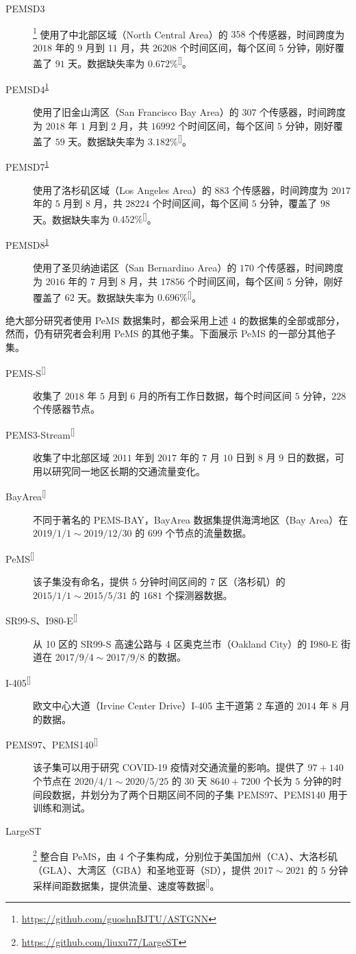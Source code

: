 \documentclass{ctexart}
\renewcommand{\cite}[1]{\textsuperscript{[\citenum{#1}]}}
\begin{document}
\begin{description}
    \item[PEMSD3]\footnote{\url{https://github.com/guoshnBJTU/ASTGNN}\label{pems0x}} 使用了中北部区域（North Central Area）的 $358$ 个传感器，时间跨度为 $2018$ 年的 $9$ 月到 $11$ 月，共 $26208$ 个时间区间，每个区间 $5$ 分钟，刚好覆盖了 $91$ 天。数据缺失率为 $0.672\%$\cite{T-158}。
    \item[PEMSD4\textsuperscript{\ref{pems0x}}] 使用了旧金山湾区（San Francisco Bay Area）的 $307$ 个传感器，时间跨度为 $2018$ 年 $1$ 月到 $2$ 月，共 $16992$ 个时间区间，每个区间 $5$ 分钟，刚好覆盖了 $59$ 天。数据缺失率为 $3.182\%$\cite{T-158}。
    \item[PEMSD7\textsuperscript{\ref{pems0x}}] 使用了洛杉矶区域（Los Angeles Area）的 $883$ 个传感器，时间跨度为 $2017$ 年的 $5$ 月到 $8$ 月，共 $28224$ 个时间区间，每个区间 $5$ 分钟，覆盖了 $98$ 天。数据缺失率为 $0.452\%$\cite{T-158}。
    \item[PEMSD8\textsuperscript{\ref{pems0x}}] 使用了圣贝纳迪诺区（San Bernardino Area）的 $170$ 个传感器，时间跨度为 $2016$ 年的 $7$ 月到 $8$ 月，共 $17856$ 个时间区间，每个区间 $5$ 分钟，刚好覆盖了 $62$ 天。数据缺失率为 $0.696\%$\cite{T-158}。
\end{description}

绝大部分研究者使用 PeMS 数据集时，都会采用上述 $4$ 的数据集的全部或部分，然而，仍有研究者会利用 PeMS 的其他子集。下面展示 PeMS 的一部分其他子集。

\begin{description}
    \item[PEMS-S\cite{T-140}] 收集了 $2018$ 年 $5$ 月到 $6$ 月的所有工作日数据，每个时间区间 $5$ 分钟，$228$ 个传感器节点。%
    \item[PEMS3-Stream\cite{T-310}] 收集了中北部区域 $2011$ 年到 $2017$ 年的 $7$ 月 $10$ 日到 $8$ 月 $9$ 日的数据，可用以研究同一地区长期的交通流量变化。
    \item[BayArea\cite{T-151}] 不同于著名的 PEMS-BAY，BayArea 数据集提供海湾地区（Bay Area）在 $2019/1/1\sim 2019/12/30$ 的 $699$ 个节点的流量数据。
    \item[PeMS\cite{T-174}] 该子集没有命名，提供 $5$ 分钟时间区间的 7 区（洛杉矶）的 $2015/1/1\sim 2015/5/31$ 的 $1681$ 个探测器数据。
    \item[SR99-S、I980-E\cite{T-181}] 从 10 区的 SR99-S 高速公路与 4 区奥克兰市（Oakland City）的 I980-E 街道在 $2017/9/4\sim2017/9/8$ 的数据。
    \item[I-405\cite{T-222}] 欧文中心大道（Irvine Center Drive）I-405 主干道第 2 车道的 $2014$ 年 $8$ 月的数据。
    \item[PEMS97、PEMS140\cite{T-348}] 该子集可以用于研究 COVID-19 疫情对交通流量的影响。提供了 $97+140$ 个节点在 $2020/4/1\sim2020/5/25$ 的 $30$ 天 $8640+7200$ 个长为 $5$ 分钟的时间段数据，并划分为了两个日期区间不同的子集 PEMS97、PEMS140 用于训练和测试。
    \item[LargeST]\footnote{\url{https://github.com/liuxu77/LargeST}} 整合自 PeMS，由 $4$ 个子集构成，分别位于美国加州（CA）、大洛杉矶（GLA）、大湾区（GBA）和圣地亚哥（SD），提供 $2017\sim2021$ 的 $5$ 分钟采样间距数据集，提供流量、速度等数据\cite{T-371}。
\end{description}
\end{document}
